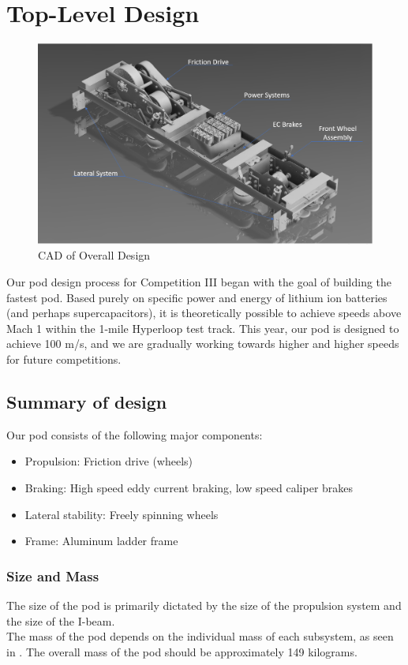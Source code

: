\documentclass[main.tex]{subfiles}
\begin{document}
\chapter{Top-Level Design}
\label{ch:top-level-design}
    \begin{figure}[H]
        \centering
        \includegraphics[width=\linewidth]{images/jimmypictwopointoh.png}
        \caption{CAD of Overall Design}
    \end{figure}

Our pod design process for Competition III began with the goal of building the fastest pod. Based purely on specific power and energy of lithium ion batteries (and perhaps supercapacitors), it is theoretically possible to achieve speeds above Mach 1 within the 1-mile Hyperloop test track. This year, our pod is designed to achieve 100 m/s, and we are gradually working towards higher and higher speeds for future competitions.

\section{Summary of design}
Our pod consists of the following major components:
\begin{itemize}
    \item Propulsion: Friction drive (wheels)
    \item Braking: High speed eddy current braking, low speed caliper brakes
    \item Lateral stability: Freely spinning wheels
    \item Frame: Aluminum ladder frame
\end{itemize}

\subsection{Size and Mass}
The size of the pod is primarily dictated by the size of the propulsion system and the size of the I-beam.\\
  The mass of the pod depends on the individual mass of each subsystem, as seen in . The overall mass of the pod should be approximately 149 kilograms.
\end{document}
